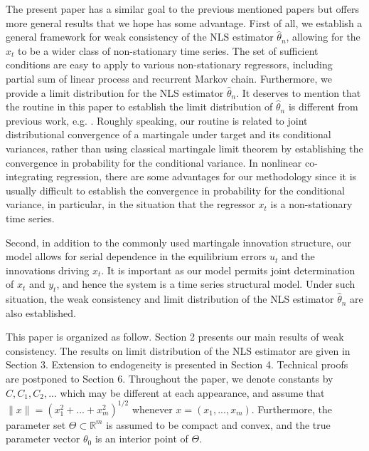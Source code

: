 The present paper has a similar goal to the previous mentioned papers but offers more general results that we hope has some advantage. First of all, we establish a general framework for  weak consistency of the NLS estimator $\hat{\theta}_n$, allowing for the $x_t$ to be  a  wider class of non-stationary time series.
 The set of sufficient conditions are easy to apply to various non-stationary regressors, including partial sum of linear process and recurrent Markov chain. Furthermore, we  provide a limit distribution for the NLS estimator $\hat{\theta}_n$. It  deserves to mention that  the routine in this paper to establish the limit distribution of $\hat\theta_n$ is different from previous work, e.g. \cite{parkphillips2001}. Roughly speaking, our routine is related to joint distributional convergence of a martingale under target and its conditional variances, rather than using classical martingale limit theorem by establishing the convergence in probability for the conditional variance.  In nonlinear co-integrating regression, there are   some advantages for our methodology  since it is usually difficult to establish the convergence in probability for the conditional variance, in particular, in the situation that the regressor $x_t$ is a non-stationary time series.

Second, in addition to the commonly used martingale innovation structure, our model allows for serial dependence in the equilibrium errors $u_t$ and the innovations driving $x_t$. It is important as our model  permits joint determination of $x_t$ and $y_t$, and hence the system is a time series structural model. Under such situation, the weak consistency and limit distribution of the NLS estimator $\hat{\theta}_n$ are also established.

This paper is organized as follow. Section 2 presents our main results of weak consistency. The results on limit distribution of the NLS estimator are given in Section 3. Extension to endogeneity is presented in Section 4. Technical proofs are postponed to Section 6. Throughout the paper, we denote constants by $C, C_1, C_2,...$ which may be different at each appearance, and assume that $\|x\|=(x_1^2+...+x_m^2)^{1/2}$ whenever $x=(x_1,...,x_m)$. Furthermore,  the parameter set $\Theta \subset \mathbb {R}^m$ is assumed to be compact and convex, and the true parameter vector $\theta_0$ is an interior point of $\Theta$.



